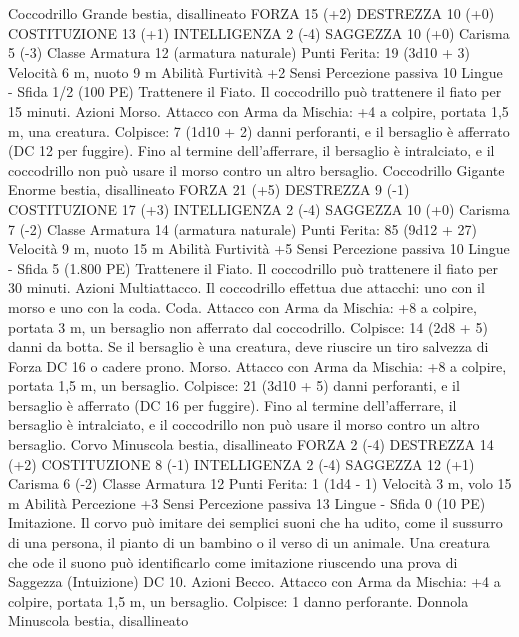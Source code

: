 \begin{multicols}{2}
Coccodrillo
Grande bestia, disallineato
FORZA 15 (+2)
DESTREZZA 10 (+0)
COSTITUZIONE 13 (+1)
INTELLIGENZA 2 (-4)
SAGGEZZA 10 (+0)
Carisma 5 (-3)
Classe Armatura 12 (armatura naturale)
\hspace*{0pt}\hfill{Punti Ferita}: 19 (3d10 + 3)
Velocità 6 m, nuoto 9 m
Abilità Furtività +2
Sensi Percezione passiva 10
Lingue -
Sfida 1/2 (100 PE)
Trattenere il Fiato. Il coccodrillo può trattenere il fiato per 15
minuti.
Azioni
Morso. Attacco con Arma da Mischia: +4 a colpire, portata 1,5
m, una creatura.
Colpisce: 7 (1d10 + 2) danni perforanti, e il bersaglio è afferrato
(DC 12 per fuggire). Fino al termine dell’afferrare, il bersaglio è
intralciato, e il coccodrillo non può usare il morso contro un altro
bersaglio.
Coccodrillo Gigante
Enorme bestia, disallineato
FORZA 21 (+5)
DESTREZZA 9 (-1)
COSTITUZIONE 17 (+3)
INTELLIGENZA 2 (-4)
SAGGEZZA 10 (+0)
Carisma 7 (-2)
Classe Armatura 14 (armatura naturale)
\hspace*{0pt}\hfill{Punti Ferita}: 85 (9d12 + 27)
Velocità 9 m, nuoto 15 m
Abilità Furtività +5
Sensi Percezione passiva 10
Lingue -
Sfida 5 (1.800 PE)
Trattenere il Fiato. Il coccodrillo può trattenere il fiato per 30
minuti.
Azioni
Multiattacco. Il coccodrillo effettua due attacchi: uno con il
morso e uno con la coda.
Coda. Attacco con Arma da Mischia: +8 a colpire, portata 3 m,
un bersaglio non afferrato dal coccodrillo.
Colpisce: 14 (2d8 + 5) danni da botta. Se il bersaglio è una
creatura, deve riuscire un tiro salvezza di Forza DC 16 o cadere
prono.
Morso. Attacco con Arma da Mischia: +8 a colpire, portata 1,5
m, un bersaglio.
Colpisce: 21 (3d10 + 5) danni perforanti, e il bersaglio è
afferrato (DC 16 per fuggire). Fino al termine dell’afferrare, il
bersaglio è intralciato, e il coccodrillo non può usare il morso
contro un altro bersaglio.
Corvo
Minuscola bestia, disallineato
FORZA 2 (-4)
DESTREZZA 14 (+2)
COSTITUZIONE 8 (-1)
INTELLIGENZA 2 (-4)
SAGGEZZA 12 (+1)
Carisma 6 (-2)
Classe Armatura 12
\hspace*{0pt}\hfill{Punti Ferita}: 1 (1d4 - 1)
Velocità 3 m, volo 15 m
Abilità Percezione +3
Sensi Percezione passiva 13
Lingue -
Sfida 0 (10 PE)
Imitazione. Il corvo può imitare dei semplici suoni che ha udito,
come il sussurro di una persona, il pianto di un bambino o il
verso di un animale. Una creatura che ode il suono può
identificarlo come imitazione riuscendo una prova di Saggezza
(Intuizione) DC 10.
Azioni
Becco. Attacco con Arma da Mischia: +4 a colpire, portata 1,5
m, un bersaglio.
Colpisce: 1 danno perforante.
Donnola
Minuscola bestia, disallineato

\end{multicols}
